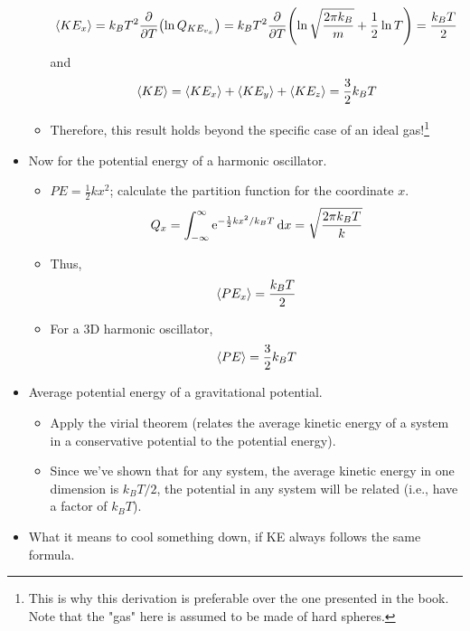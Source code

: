 \documentclass[../notes.tex]{subfiles}
\begin{document}
\begin{itemize}
\begin{itemize}
\begin{equation*}
            \prb{KE_x} = k_BT^2\pdv{T}(\ln Q_{KE_{v_x}})
            = k_BT^2\pdv{T}(\ln\sqrt{\frac{2\pi k_B}{m}}+\frac{1}{2}\ln T)
            = \frac{k_BT}{2}
        \end{equation*}
        and
        \begin{equation*}
            \prb{KE} = \prb{KE_x}+\prb{KE_y}+\prb{KE_z}
            = \frac{3}{2}k_BT
        \end{equation*}
        \item Therefore, this result holds beyond the specific case of an ideal gas!\footnote{This is why this derivation is preferable over the one presented in the book. Note that the "gas" here is assumed to be made of hard spheres.}
    \end{itemize}
    \item Now for the potential energy of a harmonic oscillator.
    \begin{itemize}
        \item $PE=\frac{1}{2}kx^2$; calculate the partition function for the coordinate $x$.
        \begin{equation*}
            Q_x = \int_{-\infty}^\infty\e[-\frac{1}{2}kx^2/k_BT]\dd{x}
            = \sqrt{\frac{2\pi k_BT}{k}}
        \end{equation*}
        \item Thus,
        \begin{equation*}
            \prb{PE_x} = \frac{k_BT}{2}
        \end{equation*}
        \item For a 3D harmonic oscillator,
        \begin{equation*}
            \prb{PE} = \frac{3}{2}k_BT
        \end{equation*}
    \end{itemize}
    \item Average potential energy of a gravitational potential.
    \begin{itemize}
        \item Apply the virial theorem (relates the average kinetic energy of a system in a conservative potential to the potential energy).
        \item Since we've shown that for any system, the average kinetic energy in one dimension is $k_BT/2$, the potential in any system will be related (i.e., have a factor of $k_BT$).
    \end{itemize}
    \item What it means to cool something down, if KE always follows the same formula.

\end{itemize}
\end{document}
